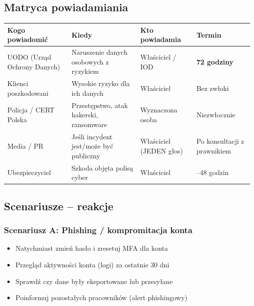 \documentclass[12pt,a4paper]{article}
\providecommand{\tightlist}{\setlength{\itemsep}{0pt}\setlength{\parskip}{0pt}}
\begin{document}
\subsection{Matryca powiadamiania}\label{matryca-powiadamiania}

\begin{longtable}[]{@{}>{\raggedright\arraybackslash}p{}>{\raggedright\arraybackslash}p{}>{\raggedright\arraybackslash}p{}>{\raggedright\arraybackslash}p{}@{}}
\toprule\noalign{}
Kogo powiadomić & Kiedy & Kto powiadamia & Termin \\
\midrule\noalign{}
\endhead
\bottomrule\noalign{}
\endlastfoot
UODO (Urząd Ochrony Danych) & Naruszenie danych osobowych z ryzykiem &
Właściciel / IOD & \textbf{72 godziny} \\
Klienci poszkodowani & Wysokie ryzyko dla ich danych & Właściciel & Bez
zwłoki \\
Policja / CERT Polska & Przestępstwo, atak hakerski, ransomware &
Wyznaczona osoba & Niezwłocznie \\
Media / PR & Jeśli incydent jest/może być publiczny & Właściciel (JEDEN
głos) & Po konsultacji z prawnikiem \\
Ubezpieczyciel & Szkoda objęta polisą cyber & Właściciel & 24--48
godzin \\
\end{longtable}

\subsection{Scenariusze -- reakcje}\label{scenariusze-reakcje}

\subsubsection*{Scenariusz A: Phishing / kompromitacja
konta}\label{scenariusz-a-phishing-kompromitacja-konta}

\begin{itemize}
\tightlist
\item
  Natychmiast zmień hasło i zresetuj MFA dla konta
\item
  Przegląd aktywności konta (logi) za ostatnie 30 dni
\item
  Sprawdź czy dane były eksportowane lub przesyłane
\item
  Poinformuj pozostałych pracowników (alert phishingowy)
\end{itemize}
\end{document}
